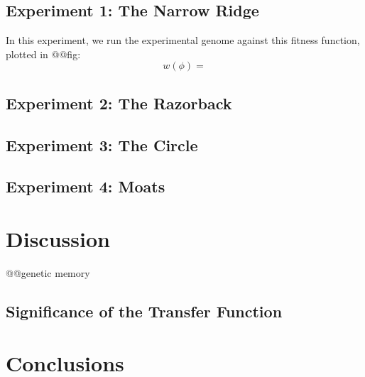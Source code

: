 \documentclass[letterpaper]{article}
\begin{document}
\subsection{Experiment 1: The Narrow Ridge}

In this experiment, we run the experimental genome against this fitness
function, plotted in @@fig:
\[
   w(\phi) = 
\]


\subsection{Experiment 2: The Razorback}

\subsection{Experiment 3: The Circle}

\subsection{Experiment 4: Moats}

\section{Discussion}

@@genetic memory

\subsection{Significance of the Transfer Function}

\section{Conclusions}



\end{document}
